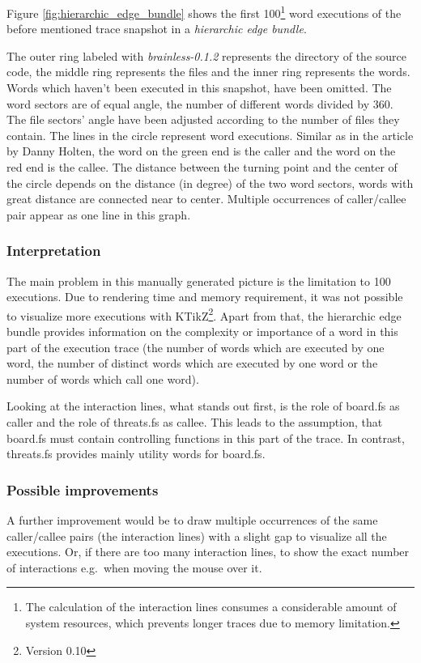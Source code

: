 Figure \ref{fig:hierarchic_edge_bundle} shows the first 100\footnote{The calculation of the interaction lines consumes a considerable amount of system resources, which prevents longer traces due to memory limitation.} word executions of the before mentioned trace snapshot in a \emph{hierarchic edge bundle}.

The outer ring labeled with \emph{brainless-0.1.2} represents the directory of the source code, the middle ring represents the files and the inner ring represents the words. Words which haven't been executed in this snapshot, have been omitted.
The word sectors are of equal angle, the number of different words divided by 360\degree. The file sectors' angle have been adjusted according to the number of files they contain.
The lines in the circle represent word executions. Similar as in the article by Danny Holten\cite{Holten:2006:HEB:1187627.1187772}, the word on the green end is the caller and the word on the red end is the callee. The distance between the turning point and the center of the circle depends on the distance (in degree) of the two word sectors, words with great distance are connected near to center. Multiple occurrences of caller/callee pair appear as one line in this graph.

\subsubsection*{Interpretation}
The main problem in this manually generated picture is the limitation to  100 executions. Due to rendering time and memory requirement, it was not possible to visualize more executions with KTikZ\footnote{Version 0.10}.
Apart from that, the hierarchic edge bundle provides information on the complexity or importance of a word in this part of the execution trace (the number of words which are executed by one word, the number of distinct words which are executed by one word or the number of words which call one word).

Looking at the interaction lines, what stands out first, is the role of board.fs as caller and the role of threats.fs as callee. This leads to the assumption, that board.fs must contain controlling functions in this part of the trace. In contrast, threats.fs provides mainly utility words for board.fs.

\subsubsection*{Possible improvements}
A further improvement would be to draw multiple occurrences of the same caller/callee pairs (the interaction lines) with a slight gap to visualize all the executions. Or, if there are too many interaction lines, to show the exact number of interactions e.g.\ when moving the mouse over it.

